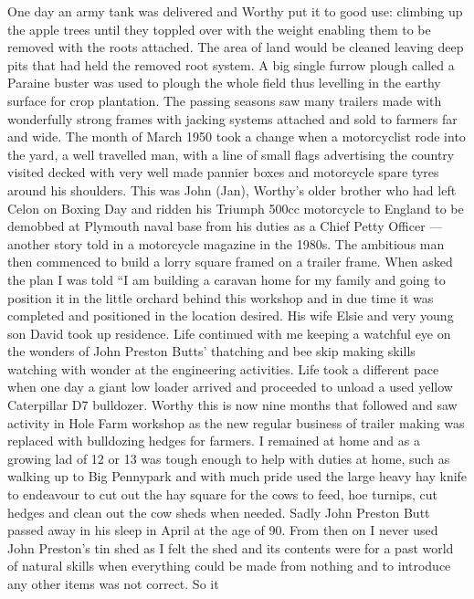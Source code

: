 
One day an army tank was delivered and Worthy put it to good use: climbing up
the apple trees until they toppled over with the weight enabling them to be
removed with the roots attached. The area of land would be cleaned leaving
deep pits that had held the removed root system. A big single furrow plough
called a Paraine buster was used to plough the whole field thus levelling in
the earthy surface for crop plantation. The passing seasons saw many trailers
made with wonderfully strong frames with jacking systems attached and sold to
farmers far and wide. The month of March 1950 took a change when a motorcyclist
rode into the yard, a well travelled man, with a line of small flags
advertising the country visited decked with very well made pannier    boxes
and motorcycle spare tyres around his shoulders. This was John (Jan), Worthy's
older brother who had left Celon on Boxing Day and ridden his Triumph 500cc
motorcycle to England to be demobbed at Plymouth naval base from his duties as
a Chief Petty Officer --- another story told in a motorcycle magazine in the
1980s. The ambitious man then commenced to build a lorry square framed on a
trailer frame. When asked the plan I was told ``I am building a caravan home
for my family and going to position it in the little orchard behind this
workshop and in due time it was completed and positioned in the location
desired. His wife Elsie and very young son David took up residence. Life
continued with me keeping a watchful eye on the wonders of John Preston Butts'
thatching and bee skip making skills watching with wonder at the engineering
activities. Life took a different pace when one day a giant low loader arrived
and proceeded to unload a used yellow Caterpillar D7 bulldozer. Worthy this is
now nine months that followed and saw activity in Hole Farm workshop as the new
regular business of trailer making was replaced with bulldozing hedges for
farmers. I remained at home and as a growing lad of 12 or 13 was tough enough
to help with duties at home, such as walking up to Big Pennypark and with much
pride used the large heavy hay knife to endeavour to cut out the hay square for
the cows to feed, hoe turnips, cut hedges and clean out the cow sheds when
needed. Sadly John Preston Butt passed away in his sleep in April at the age
of 90. From then on I never used John Preston's tin shed as I felt the shed
and its contents were for a past world of natural skills when everything could
be made from nothing and to introduce any other items was not correct. So it
